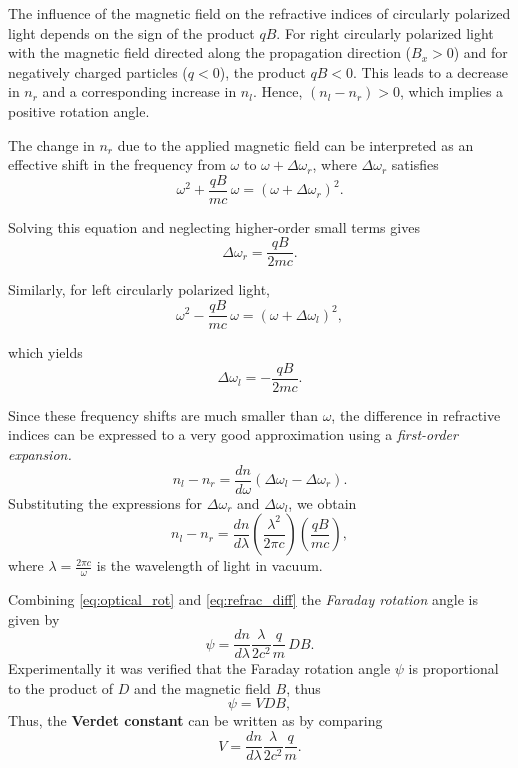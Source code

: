 The influence of the magnetic field on the refractive indices of circularly polarized light depends on the sign of the product $qB$. For right circularly polarized light with the magnetic field directed along the propagation direction ($B_x > 0$) and for negatively charged particles ($q < 0$), the product $qB < 0$. This leads to a decrease in $n_r$ and a corresponding increase in $n_l$. Hence, $(n_l - n_r) > 0$, which implies a positive rotation angle.

The change in $n_r$ due to the applied magnetic field can be interpreted as an effective shift in the frequency from $\omega$ to $\omega + \Delta \omega_r$, where $\Delta \omega_r$ satisfies
\begin{equation}
\omega^2 + \frac{qB}{mc}\,\omega = (\omega + \Delta \omega_r)^2.
\end{equation}

Solving this equation and neglecting higher-order small terms gives
\begin{equation}
\boxed{\Delta \omega_r = \frac{qB}{2mc}.}
\end{equation}

Similarly, for left circularly polarized light,
\begin{equation}
\omega^2 - \frac{qB}{mc}\,\omega = (\omega + \Delta \omega_l)^2,
\end{equation}

which yields
\begin{equation}
\boxed{\Delta \omega_l = -\frac{qB}{2mc}.}
\end{equation}

Since these frequency shifts are much smaller than $\omega$, the difference in refractive indices can be expressed to a very good approximation using a \emph{first-order expansion.}
\begin{equation}
n_l - n_r = \frac{dn}{d\omega}(\Delta \omega_l - \Delta \omega_r).
\end{equation}
Substituting the expressions for $\Delta \omega_r$ and $\Delta \omega_l$, we obtain
\begin{equation}
n_l - n_r = \frac{dn}{d\lambda}\left(\frac{\lambda^2}{2\pi c}\right)\left(\frac{qB}{mc}\right), \label{eq:refrac_diff}
\end{equation}
where $\lambda = \frac{2\pi c}{\omega}$ is the wavelength of light in vacuum.

Combining \cref{eq:optical_rot} and \ref{eq:refrac_diff} the \emph{Faraday rotation} angle is given by
\begin{equation}
\psi = \frac{dn}{d\lambda} \frac{\lambda}{2c^2}\frac{q}{m} \, DB.
\end{equation}
Experimentally it was verified that the Faraday rotation angle $\psi$ is proportional to the product of $D$ and the magnetic field $B$, thus
\begin{equation}
    \boxed{\psi = VDB,}
\end{equation}
Thus, the \textbf{Verdet constant} can be written as by comparing 
\begin{equation}
\boxed{V = \frac{dn}{d\lambda} \frac{\lambda}{2c^2}\frac{q}{m}.}
\end{equation}


